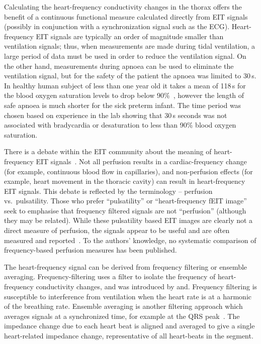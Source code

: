Calculating the heart-frequency conductivity 
changes in the thorax offers the benefit of a continuous functional
measure calculated directly from EIT signals (possibly
in conjunction with a synchronization signal such as the ECG).
Heart-frequency EIT signals are typically an order of magnitude smaller than
ventilation signals; thus, when measurements are made during
tidal ventilation, a large period of data must be used
in order to reduce the ventilation signal. On the other hand,
measurements during apnoea can be used to eliminate the ventilation signal,
but for the safety of the patient the apnoea was limited to 30\,s.
In healthy human subject of less than one year old it 
takes a mean of 118\,s 
for the blood oxygen saturation levels to drop below
90\%~\parencite{fu_study_1996}, however
the length of safe apnoea is much shorter for the sick preterm infant.
The time period was chosen based on experience in the lab showing 
that 30\,s seconds was
not associated with bradycardia or desaturation to less than 90\% blood oxygen saturation.

There is a debate within the EIT community about the meaning of
heart-frequency EIT signals~\parencite{frerichs_chest_2017,adler_electrical_2017}. 
Not all perfusion results in a
cardiac-frequency change (for example, continuous blood flow in capillaries),
and
non-perfusion effects (for example, heart movement in the thoracic cavity)
can result in heart-frequency EIT signals.
This debate is reflected by the terminology 
-- perfusion vs.\ pulsatility.
Those who prefer ``pulsatility'' or ``heart-frequency fEIT image'' seek to emphasise that frequency
filtered signals are not ``perfusion'' (although they may be related).
While these pulsatility based EIT images are clearly not a direct measure of
perfusion, the signals appear to be useful and are often measured and 
reported~\parencite{bartocci_cerebral_1999,halter_imaging_2008,moens_variety_2014,ericsson_effect_2016}. 
To the authors' knowledge, no systematic comparison of
frequency-based perfusion measures has been published.

The heart-frequency signal can be derived from
frequency filtering or ensemble averaging.
Frequency-filtering uses a filter to isolate the frequency of heart-frequency conductivity changes,
and was introduced by and. 
Frequency filtering is susceptible
to interference from ventilation when the heart rate is at a harmonic
of the breathing rate.
Ensemble averaging is another filtering approach which
averages signals at a synchronized time, for example at the QRS 
peak~\parencite{bartocci_cerebral_1999,deibele_dynamic_2008}. The impedance change due to each heart 
beat is aligned and averaged to give a single heart-related impedance change,
representative of all heart-beats in the segment.

